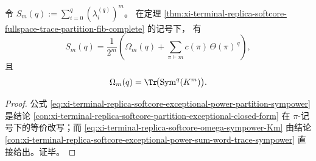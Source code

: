 \begin{theorem}[例外谱幂和的分拆闭式与对称幂表征]\label{thm:xi-terminal-replica-softcore-exceptional-power-partition-sympower}
令
\(
S_m(q):=\sum_{i=0}^{q}(\lambda_i^{(q)})^m
\)。
在定理 \ref{thm:xi-terminal-replica-softcore-fullspace-trace-partition-fib-complete} 的记号下，
有
\begin{equation}\label{eq:xi-terminal-replica-softcore-exceptional-power-partition-sympower}
S_m(q)=\frac1{2^m}\left(
\Omega_m(q)+\sum_{\pi\vdash m}c(\pi)\,\Theta(\pi)^{\,q}
\right),
\end{equation}
且
\begin{equation}\label{eq:xi-terminal-replica-softcore-omega-sympower-Km}
\Omega_m(q)=\Tr\!\bigl(\operatorname{Sym}^q(K^m)\bigr).
\end{equation}
\end{theorem}
\begin{proof}
公式 \eqref{eq:xi-terminal-replica-softcore-exceptional-power-partition-sympower}
是结论 \ref{con:xi-terminal-replica-softcore-partition-exceptional-closed-form}
在 \(\pi\)-记号下的等价改写；而
\eqref{eq:xi-terminal-replica-softcore-omega-sympower-Km}
由结论
\ref{con:xi-terminal-replica-softcore-exceptional-power-sum-word-trace-sympower}
直接给出。证毕。
\end{proof}

